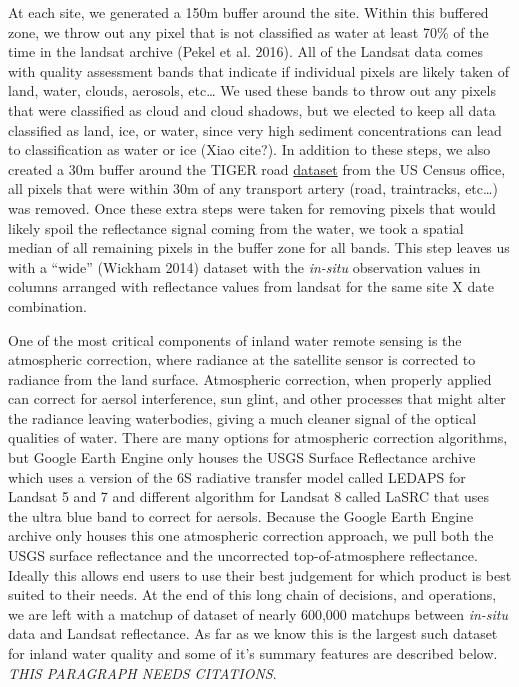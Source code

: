 \documentclass[]{article}
\begin{document}
At each site, we generated a 150m buffer around the site. Within this
buffered zone, we throw out any pixel that is not classified as water at
least 70\% of the time in the landsat archive (Pekel et al. 2016). All
of the Landsat data comes with quality assessment bands that indicate if
individual pixels are likely taken of land, water, clouds, aerosols,
etc\ldots{} We used these bands to throw out any pixels that were
classified as cloud and cloud shadows, but we elected to keep all data
classified as land, ice, or water, since very high sediment
concentrations can lead to classification as water or ice (Xiao cite?).
In addition to these steps, we also created a 30m buffer around the
TIGER road
\href{https://www.census.gov/geo/maps-data/data/tiger.html}{dataset}
from the US Census office, all pixels that were within 30m of any
transport artery (road, traintracks, etc\ldots{}) was removed. Once
these extra steps were taken for removing pixels that would likely spoil
the reflectance signal coming from the water, we took a spatial median
of all remaining pixels in the buffer zone for all bands. This step
leaves us with a ``wide'' (Wickham 2014) dataset with the \emph{in-situ}
observation values in columns arranged with reflectance values from
landsat for the same site X date combination.

One of the most critical components of inland water remote sensing is
the atmospheric correction, where radiance at the satellite sensor is
corrected to radiance from the land surface. Atmospheric correction,
when properly applied can correct for aersol interference, sun glint,
and other processes that might alter the radiance leaving waterbodies,
giving a much cleaner signal of the optical qualities of water. There
are many options for atmospheric correction algorithms, but Google Earth
Engine only houses the USGS Surface Reflectance archive which uses a
version of the 6S radiative transfer model called LEDAPS for Landsat 5
and 7 and different algorithm for Landsat 8 called LaSRC that uses the
ultra blue band to correct for aersols. Because the Google Earth Engine
archive only houses this one atmospheric correction approach, we pull
both the USGS surface reflectance and the uncorrected top-of-atmosphere
reflectance. Ideally this allows end users to use their best judgement
for which product is best suited to their needs. At the end of this long
chain of decisions, and operations, we are left with a matchup of
dataset of nearly 600,000 matchups between \emph{in-situ} data and
Landsat reflectance. As far as we know this is the largest such dataset
for inland water quality and some of it's summary features are described
below. \emph{THIS PARAGRAPH NEEDS CITATIONS}.
\end{document}
